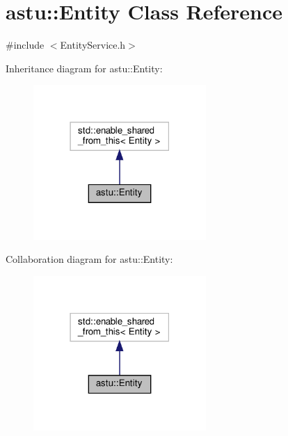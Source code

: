 \hypertarget{classastu_1_1Entity}{}\section{astu\+:\+:Entity Class Reference}
\label{classastu_1_1Entity}


{\ttfamily \#include $<$Entity\+Service.\+h$>$}



Inheritance diagram for astu\+:\+:Entity\+:\nopagebreak
\begin{figure}[H]
\begin{center}
\leavevmode
\includegraphics[width=186pt]{classastu_1_1Entity__inherit__graph}
\end{center}
\end{figure}


Collaboration diagram for astu\+:\+:Entity\+:\nopagebreak
\begin{figure}[H]
\begin{center}
\leavevmode
\includegraphics[width=186pt]{classastu_1_1Entity__coll__graph}
\end{center}
\end{figure}
